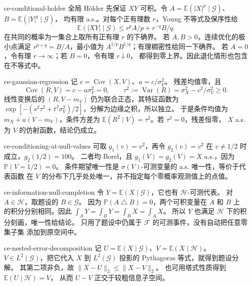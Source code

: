 \begin{solution}{ce-conditional-holder}
全局 Hölder 先保证 $XY$ 可积。令
$A=\mathbb E(|X|^p\mid\mathcal G)$、$B=\mathbb E(|Y|^q\mid\mathcal G)$，
均有限 a.s.。对每个正有理数 $r$，Young 不等式及保序性给
\[
 \mathbb E(|XY|\mid\mathcal G)\le r^pA/p+r^{-q}B/q.
\]
在共同的概率为一集合上取所有正有理 $r$ 的下确界。
若 $A,B>0$，连续优化的极小点满足 $r^{p+q}=B/A$，最小值为
$A^{1/p}B^{1/q}$；有理稠密性给同一下确界。
若 $A=0$，令有理 $r\to\infty$；若 $B=0$，令有理 $r\downarrow0$，
都得到零上界。因此退化情形也包含在不等式中。
\end{solution}

\begin{solution}{ce-gaussian-regression}
记 $c=\operatorname{Cov}(X,V)$、$a=c/\sigma_V^2$。
残差均值零，且
\[
 \operatorname{Cov}(R,V)=c-a\sigma_V^2=0,\qquad
 \tau^2:=\operatorname{Var}(R)
      =\sigma_X^2-c^2/\sigma_V^2\ge0.
\]
线性变换后的 $(R,V-m_V)$ 仍为联合正态，其特征函数为
$\exp[-(s^2\tau^2+t^2\sigma_V^2)/2]$，分解为边缘之积，所以独立。
于是条件均值为 $m_X+a(V-m_V)$，条件方差为
$\mathbb E(R^2\mid V)=\tau^2$。若 $\tau^2=0$，残差恒零，
$X$ a.s. 为 $V$ 的仿射函数，结论仍成立。
\end{solution}

\begin{solution}{ce-conditioning-at-null-values}
可取 $g_1(v)=v^2$，再令
$g_2(v)=v^2$ 在 $v\ne1/2$ 时成立，$g_2(1/2)=100$。
二者均 Borel，且 $g_1(V)=g_2(V)=X$ a.s.，因为 $\mathbb P(V=1/2)=0$。
条件期望唯一性是 $\sigma(V)$-可测变量的 a.s. 唯一性，等价于代表函数
在 $V$ 的分布下几乎处处唯一，并不指定每个零概率观测值上的点值。
\end{solution}

\begin{solution}{ce-information-null-completion}
令 $Y=\mathbb E(X\mid\mathcal G)$，它也有 $\mathcal H$-可测代表。
对 $A\in\mathcal H$，取题设的 $B\in\mathcal G$。
因为 $\mathbb P(A\mathbin\triangle B)=0$，两个可积变量在 $A$ 和 $B$ 上
的积分分别相同。因此
$\int_A Y=\int_B Y=\int_B X=\int_A X$。
所以 $Y$ 也满足 $\mathcal H$ 下的积分刻画，唯一性给结论。
只用了题设中仍属于 $\mathcal F$ 的可测事件，没有自动把任意零集子集
添加到原空间中。
\end{solution}

\begin{solution}{ce-nested-error-decomposition}
记 $U=\mathbb E(X\mid\mathcal G)$、$V=\mathbb E(X\mid\mathcal H)$。
$V\in L^2(\mathcal G)$，把它代入 $X$ 到 $L^2(\mathcal G)$ 投影的
Pythagoras 等式，就得到题设分解。
其第二项非负，故 $\|X-U\|_2\le\|X-V\|_2$。
也可用塔式性质得到 $\mathbb E(U\mid\mathcal H)=V$，
从而 $U-V$ 正交于较粗信息子空间。
\end{solution}

